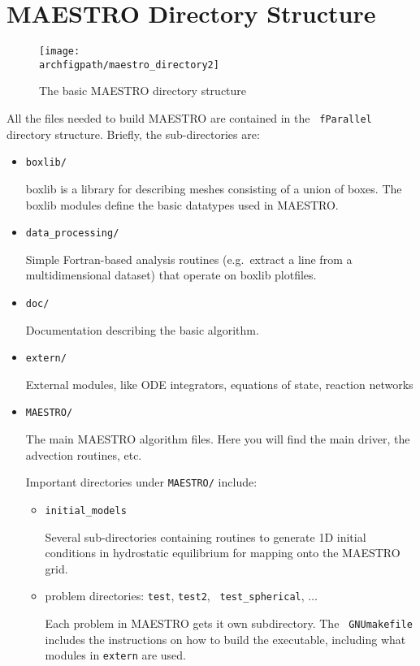 \section{MAESTRO Directory Structure}

\begin{figure}[h]
\centering
\texttt{[image: \\archfigpath/maestro\_directory2]}
\caption{The basic MAESTRO directory structure}
\end{figure}

All the files needed to build MAESTRO are contained in the {\tt
fParallel} directory structure.  Briefly, the sub-directories
are:
\begin{itemize}
\item {\tt boxlib/} 

 boxlib is a library for describing meshes consisting of a union
 of boxes.  The boxlib modules define the basic datatypes used
 in MAESTRO.

\item {\tt data\_processing/}

 Simple Fortran-based analysis routines (e.g.\ extract a line from a
 multidimensional dataset) that operate on boxlib plotfiles.

\item {\tt doc/}

 Documentation describing the basic algorithm.

\item {\tt extern/}

 External modules, like ODE integrators, equations of state, reaction
 networks

\item {\tt MAESTRO/}

 The main MAESTRO algorithm files.  Here you will find the main driver,
 the advection routines, etc.

 Important directories under {\tt MAESTRO/} include:

 \begin{itemize}

 \item {\tt initial\_models}

   Several sub-directories containing routines to generate
   1D initial conditions in hydrostatic equilibrium for 
   mapping onto the MAESTRO grid.

 \item problem directories: {\tt test}, {\tt test2}, {\tt
   test\_spherical}, $\ldots$

   Each problem in MAESTRO gets it own subdirectory.  The {\tt
   GNUmakefile} includes the instructions on how to build the
   executable, including what modules in {\tt extern} are used.


\end{itemize}
\end{itemize}
